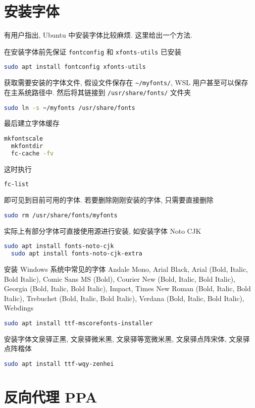 \section{安装字体}\label{sec:addition:font}

有用户指出,
Ubuntu 中安装字体比较麻烦.
这里给出一个方法.

在安装字体前先保证 \texttt{fontconfig} 和 \texttt{xfonts-utils} 已安装
\begin{lstlisting}[language=bash]
  sudo apt install fontconfig xfonts-utils
\end{lstlisting}
获取需要安装的字体文件,
假设文件保存在 \verb|~/myfonts/|,
WSL 用户甚至可以保存在主系统路径中.
然后将其链接到 \texttt{/usr/share/fonts/} 文件夹
\begin{lstlisting}[language=bash]
  sudo ln -s ~/myfonts /usr/share/fonts
\end{lstlisting}
最后建立字体缓存
\begin{lstlisting}[language=bash]
  mkfontscale
  mkfontdir
  fc-cache -fv
\end{lstlisting}
这时执行
\begin{lstlisting}[language=bash]
  fc-list
\end{lstlisting}
即可见到目前可用的字体.
若要删除刚刚安装的字体,
只需要直接删除
\begin{lstlisting}[language=bash]
  sudo rm /usr/share/fonts/myfonts
\end{lstlisting}

实际上有部分字体可直接使用源进行安装,
如安装字体 Noto CJK
\begin{lstlisting}[language=bash]
  sudo apt install fonts-noto-cjk
  sudo apt install fonts-noto-cjk-extra
\end{lstlisting}
安装 Windows 系统中常见的字体 Andale Mono,
Arial Black,
Arial (Bold, Italic, Bold Italic),
Comic Sans MS (Bold),
Courier New (Bold, Italic, Bold Italic),
Georgia (Bold, Italic, Bold Italic),
Impact,
Times New Roman (Bold, Italic, Bold Italic),
Trebuchet (Bold, Italic, Bold Italic),
Verdana (Bold, Italic, Bold Italic),
Webdings
\begin{lstlisting}[language=bash]
  sudo apt install ttf-mscorefonts-installer
\end{lstlisting}
安装字体文泉驿正黑,
文泉驿微米黑,
文泉驿等宽微米黑,
文泉驿点阵宋体,
文泉驿点阵楷体
\begin{lstlisting}[language=bash]
  sudo apt install ttf-wqy-zenhei
\end{lstlisting}

\section{反向代理 PPA}\label{sec:addition:proxy}

